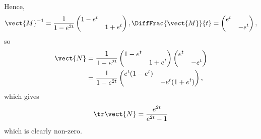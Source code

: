 \begin{enumerate}
          Hence,
          \[
              \vect{M}^{-1} = \frac{1}{1 - e^{2t}} \begin{pmatrix}
                  1 - e^t & \\ & 1 + e^t
              \end{pmatrix},
              \DiffFrac{\vect{M}}{t} = \begin{pmatrix}
                  e^t & \\ & -e^t
              \end{pmatrix},
          \]
          so
          \begin{align*}
              \vect{N} & = \frac{1}{1 - e^{2t}} \begin{pmatrix}
                                                    1 - e^t & \\ & 1 + e^t
                                                \end{pmatrix}
              \begin{pmatrix}
                  e^t & \\ & -e^t
              \end{pmatrix}                                                       \\
                       & = \frac{1}{1 - e^{2t}} \begin{pmatrix}
                                                    e^t (1 - e^t) & \\ & -e^t (1 + e^t)
                                                \end{pmatrix},
          \end{align*}
          which gives
          \[
              \tr \vect{N} = \frac{e^{2t}}{e^{2t} - 1}
          \]
          which is clearly non-zero.
\end{enumerate}